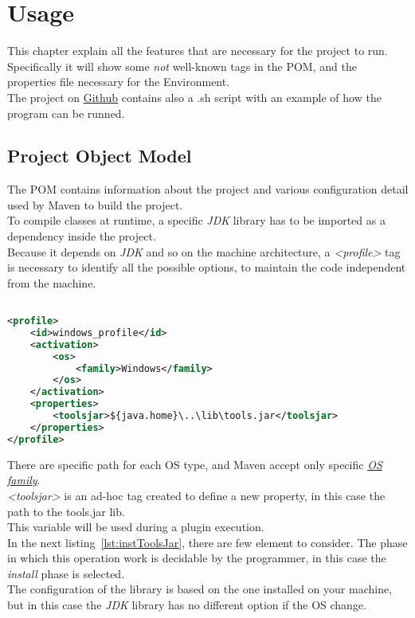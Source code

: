 \chapter{Usage}\label{ch:usage}
This chapter explain all the features that are necessary for the project to run.\\
Specifically it will show some \emph{not} well-known tags in the POM, and the properties file necessary for the Environment.\\
The project on \href{\projRoot}{Github} contains also a .sh script with an example of how the program can be runned.
\section{Project Object Model}\label{sec:pom}
The POM contains information about the project and various configuration detail used by Maven to build the project.\\
To compile classes at runtime, a specific \emph{JDK} library has to be imported as a dependency inside the project.\\
Because it depends on \emph{JDK} and so on the machine architecture, a \emph{<profile>} tag is necessary to identify all the possible options, to maintain the code independent from the machine.
\begin{lstlisting}[language=XML,caption={Windows default profile for jdk lib},label={lst:winToolsJar}]% Start your code-block

<profile>
	<id>windows_profile</id>
	<activation>
		<os>
			<family>Windows</family>
		</os>
	</activation>
	<properties>
		<toolsjar>${java.home}\..\lib\tools.jar</toolsjar>
	</properties>
</profile>
\end{lstlisting}
There are specific path for each OS type, and Maven accept only specific \href{http://maven.apache.org/enforcer/enforcer-rules/requireOS.html}{\emph{OS family}}.\\
\emph{<toolsjar>} is an ad-hoc tag created to define a new property, in this case the path to the tools.jar lib.\\
This variable will be used during a plugin execution.\\
In the next listing~\ref{lst:instToolsJar}, there are few element to consider.
The phase in which this operation work is decidable by the programmer, in this case the \emph{install} phase is selected.\\
The configuration of the library is based on the one installed on your machine, but in this case the \emph{JDK} library has no different option if the OS change.\\
